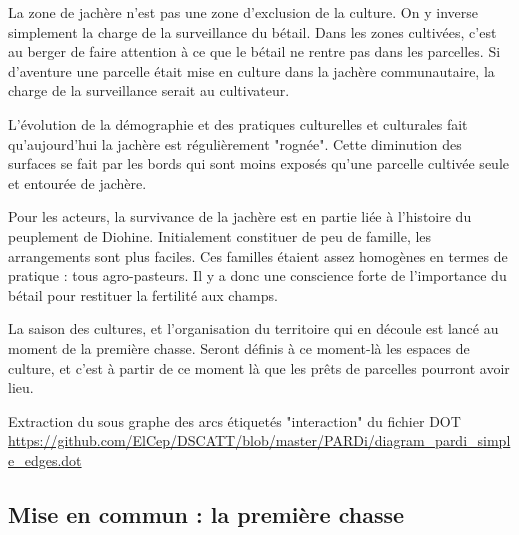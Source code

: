 La zone de jachère n'est pas une zone d'exclusion de la culture. On y inverse simplement la charge de la surveillance du bétail. Dans les zones cultivées, c'est au berger de faire attention à ce que le bétail ne rentre pas dans les parcelles. Si d'aventure une parcelle était mise en culture dans la jachère communautaire, la charge de la surveillance serait au cultivateur.

L'évolution de la démographie et des pratiques culturelles et culturales fait qu'aujourd'hui la jachère est régulièrement "rognée". Cette diminution des surfaces se fait par les bords qui sont moins exposés qu'une parcelle cultivée seule et entourée de jachère.

Pour les acteurs, la survivance de la jachère est en partie liée à l'histoire du peuplement de Diohine. Initialement constituer de peu de famille, les arrangements sont plus faciles. Ces familles étaient assez homogènes en termes de pratique : tous agro-pasteurs. Il y a donc une conscience forte de l'importance du bétail pour restituer la fertilité aux champs.

La saison des cultures, et l'organisation du territoire qui en découle est lancé au moment de la première chasse. Seront définis à ce moment-là les espaces de culture, et c'est à partir de ce moment là que les prêts de parcelles pourront avoir lieu.

Extraction du sous graphe des arcs étiquetés  "interaction" du fichier DOT \url{https://github.com/ElCep/DSCATT/blob/master/PARDi/diagram_pardi_simple_edges.dot}

 \subsection{Mise en commun : la première chasse}\label{sec:premierchasse}




